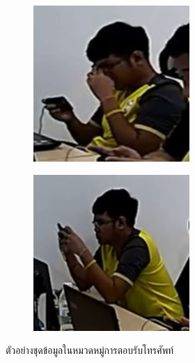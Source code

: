 \begin{figure}[!ht]
\begin{subfigure}[b]{0.45\linewidth}
    \end{subfigure}
    \begin{subfigure}[b]{0.45\linewidth}
      \includegraphics[width=\linewidth]{appendix/answer_phone/000_CXS0_D0_001792.jpg}
    \end{subfigure}
    \begin{subfigure}[b]{0.45\linewidth}
      \includegraphics[width=\linewidth]{appendix/answer_phone/000_CXS0_D0_001793.jpg}
    \end{subfigure}
    \caption{ตัวอย่างชุดข้อมูลในหมวดหมู่การตอบรับโทรศัพท์}
    \label{fig:result_track}
  \end{figure}

